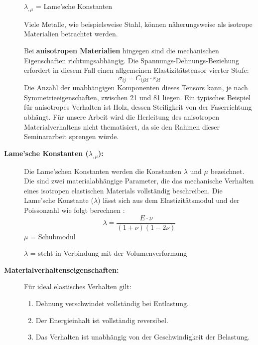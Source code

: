 \begin{description}
	 $\lambda_{,\mu}$ = Lame’sche Konstanten
	 
	 Viele Metalle, wie beispielsweise Stahl, können näherungsweise als isotrope Materialien betrachtet werden.
	 
	 \vspace{0.5em}
	 Bei \textbf{anisotropen Materialien} hingegen sind die mechanischen Eigenschaften richtungsabhängig. 
	 Die Spannungs-Dehnungs-Beziehung erfordert in diesem Fall einen allgemeinen Elastizitätstensor vierter Stufe:
		 \begin{equation}
	 		\sigma_{ij} = 
	 		C_{ijkl} \cdot \varepsilon_{kl}
		 \end{equation}
	 Die Anzahl der unabhängigen Komponenten dieses Tensors kann, je nach Symmetrieeigenschaften, zwischen 21 und 81 liegen. 
	 Ein typisches Beispiel für anisotropes Verhalten ist Holz, dessen Steifigkeit von der Faserrichtung abhängt.
	 Für unsere Arbeit wird die Herleitung des anisotropen Materialverhaltens nicht thematisiert, da sie den Rahmen dieser Seminararbeit sprengen würde.
	 
	 \item[\textbf{Lame’sche Konstanten ($\lambda_{,\mu}$):}] Die Lame'schen Konstanten werden die Konstanten $\lambda$ und $\mu$ bezeichnet. 
	 Die sind zwei materialabhängige Parameter, die das mechanische Verhalten eines isotropen elastischen Materials vollständig beschreiben.
	 Die Lame’sche Konstante ($\lambda$) lässt sich aus dem Elastizitätsmodul und der Poissonzahl wie folgt berechnen \cite{elastomechanik:Grundlagen_der_Elastizitaetstheorie}:
	 \begin{equation}
	 	\lambda = 
	 	\frac{E \cdot \nu}{(1 + \nu)(1 - 2\nu)}
	 \end{equation}
	 $\mu$ = Schubmodul
	 
	 $\lambda$ = steht in Verbindung mit der Volumenverformung
	 
	 \item[\textbf{Materialverhaltenseigenschaften:}] Für ideal elastisches Verhalten gilt:
	 \begin{enumerate}
	 	\item Dehnung verschwindet vollständig bei Entlastung.
	 	
	 	\item Der Energieinhalt ist vollständig reversibel.
	 	
	 	\item Das Verhalten ist unabhängig von der Geschwindigkeit der Belastung.
	 	

\end{enumerate}
\end{description}
